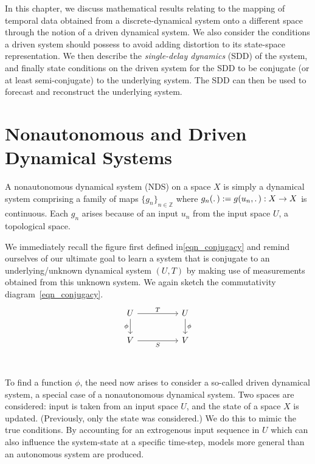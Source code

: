 In this chapter, we discuss mathematical results relating to the mapping of temporal data obtained from a discrete-dynamical system onto a different space through the notion of a driven dynamical system. 
We also consider the conditions a driven system should possess to avoid adding distortion to its state-space representation. 
We then describe the \emph{single-delay dynamics} (SDD) of the system, and finally state conditions on the driven system for the SDD to be conjugate (or at least semi-conjugate) to the underlying system. 
The SDD can then be used to forecast and reconstruct the underlying system. 

\section{Nonautonomous and Driven Dynamical Systems}

\begin{Definition}
  \label{Dfn_NDS}\rm
  A nonautonomous dynamical system (NDS) on a space $X$ is simply a dynamical system comprising a family of maps ${\{g_n\}}_{n \in \mathbb{Z}}$ where $g_n(\ldotp):=g(u_n,\ldotp):X\to{X}$ is continuous. Each $g_n$ arises because of an input $u_n$ from the input space $U$, a topological space. 
\end{Definition}

We immediately recall the figure first defined in\eqref{eqn_conjugacy}  and remind ourselves of our ultimate goal to learn a system that is conjugate to an underlying/unknown dynamical system $(U,T)$ by making use of measurements obtained from  this unknown system. 
We again sketch the commutativity diagram~\ref{eqn_conjugacy}.
\begin{equation*}\label{UV_conjugacy}
  \begin{tikzcd}
    U && U \\
    V && V \\
    \arrow["T", from=1-1, to=1-3]
    \arrow["\phi", from=1-3, to=2-3]
    \arrow["\phi"', from=1-1, to=2-1]
    \arrow["S"', from=2-1, to=2-3]
  \end{tikzcd}
  \end{equation*}

To find a function $\phi$, the need now arises to consider a so-called driven dynamical system, a special case of a nonautonomous dynamical system. 
Two spaces are considered: input is taken from an input space $U$, and the state of a space $X$ is updated. (Previously, only the state was considered.)
We do this to mimic the true conditions. By accounting for an extrogenous input sequence in $U$ which can also influence the  system-state at a specific time-step, models more general than an autonomous system are produced.

